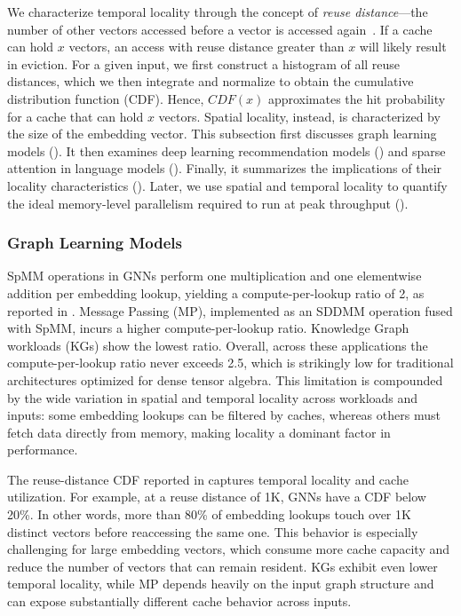 We characterize temporal locality through the concept of \emph{reuse distance}---the number of other vectors accessed before a vector is accessed again~\cite{ding2003pldi}. If a cache can hold $x$ vectors, an access with reuse distance greater than $x$ will likely result in eviction. For a given input, we first construct a histogram of all reuse distances, which we then integrate and normalize to obtain the cumulative distribution function (CDF). Hence, $CDF(x)$ approximates the hit probability for a cache that can hold $x$ vectors. Spatial locality, instead, is characterized by the size of the embedding vector. This subsection first discusses graph learning models (). It then examines deep learning recommendation models () and sparse attention in language models (). Finally, it summarizes the implications of their locality characteristics (). Later, we use spatial and temporal locality to quantify the ideal memory-level parallelism required to run at peak throughput ().

\subsubsection{Graph Learning Models} \label{sec:embedding-characterization-graph-learning} %

SpMM operations in GNNs perform one multiplication and one elementwise addition per embedding lookup, yielding a compute-per-lookup ratio of 2, as reported in . Message Passing (MP), implemented as an SDDMM operation fused with SpMM, incurs a higher compute-per-lookup ratio. Knowledge Graph workloads (KGs) show the lowest ratio. Overall, across these applications the compute-per-lookup ratio never exceeds 2.5, which is strikingly low for traditional architectures optimized for dense tensor algebra. This limitation is compounded by the wide variation in spatial and temporal locality across workloads and inputs: some embedding lookups can be filtered by caches, whereas others must fetch data directly from memory, making locality a dominant factor in performance.

The reuse-distance CDF reported in  captures temporal locality and cache utilization. For example, at a reuse distance of 1K, GNNs have a CDF below 20\%. In other words, more than 80\% of embedding lookups touch over 1K distinct vectors before reaccessing the same one. This behavior is especially challenging for large embedding vectors, which consume more cache capacity and reduce the number of vectors that can remain resident. KGs exhibit even lower temporal locality, while MP depends heavily on the input graph structure and can expose substantially different cache behavior across inputs.

